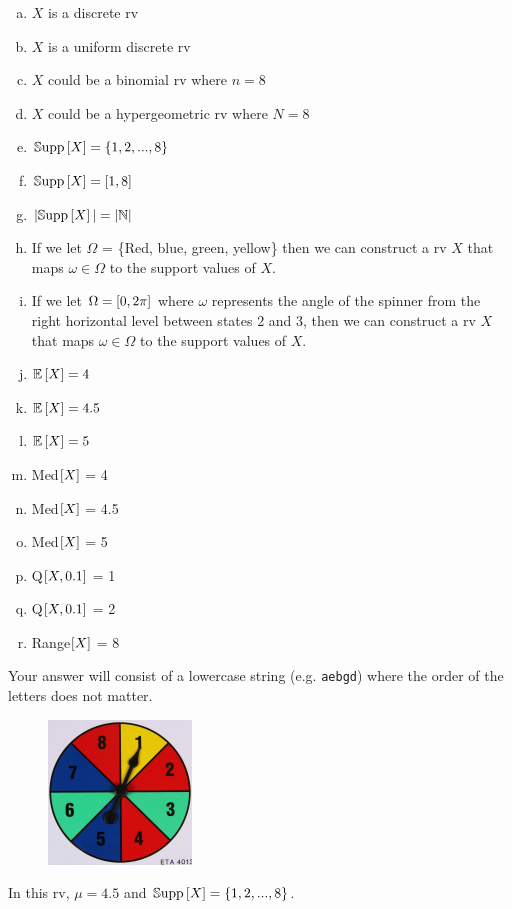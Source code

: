 \documentclass[12pt,landscape]{article}
\newcommand{\instr}{\small Your answer will consist of a lowercase string (e.g. \texttt{aebgd}) where the order of the letters does not matter. \normalsize}
\begin{document}
\benum{} 
\begin{enumerate}[(a)]

\vspace{-0.2cm}
\item $X$ is a discrete rv
\item $X$ is a uniform discrete rv
\item $X$ could be a binomial rv where $n = 8$
\item $X$ could be a hypergeometric rv where $N = 8$
\item $\mathbb{S}\text{upp}\left[X\right] = \left\{1, 2,..., 8\right\}$
\item $\mathbb{S}\text{upp}\left[X\right] = \left[1, 8\right]$
\item $|\mathbb{S}\text{upp}\left[X\right]| = |\mathbb{N}|$
\item If we let $\Omega$ = \{Red, blue, green, yellow\} then we can construct a rv $X$ that maps $\omega \in \Omega$ to the support values of $X$.
\item If we let $\Omega = \left[0, 2\pi\right]$ where $\omega$ represents the angle of the spinner from the right horizontal level between states 2 and 3, then we can construct a rv $X$ that maps $\omega \in \Omega$ to the support values of $X$.
\item $\mathbb{E}\left[X\right] = 4$
\item $\mathbb{E}\left[X\right] = 4.5$
\item $\mathbb{E}\left[X\right] = 5$
\item Med$\left[X\right]$ = 4
\item Med$\left[X\right]$ = 4.5
\item Med$\left[X\right]$ = 5
\item Q$\left[X, 0.1\right]$ = 1
\item Q$\left[X, 0.1\right]$ = 2
\item Range$\left[X\right]$ = 8
\end{enumerate}
\eenum\instr\pagebreak

\begin{figure}
\includegraphics[width=1.5in]{spinner.png}
\end{figure} \problem{}  In this rv, $\mu = 4.5$ and $\mathbb{S}\text{upp}\left[X\right] = \left\{1, 2,..., 8\right\}$.
\end{document}

